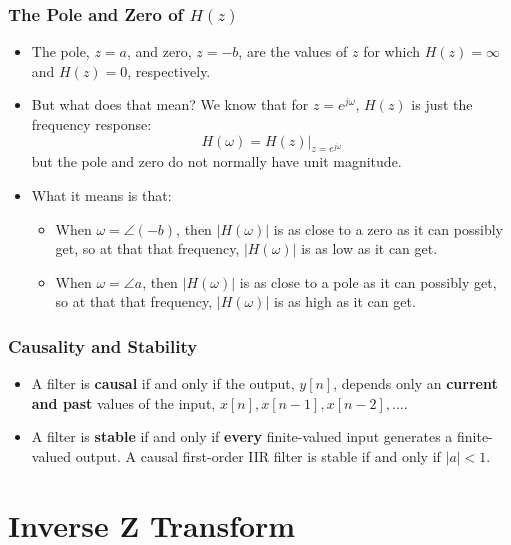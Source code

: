 \documentclass{beamer}
\begin{document}
\begin{frame}
  \frametitle{The Pole and Zero of $H(z)$}

  \begin{itemize}
  \item The pole, $z=a$, and zero, $z=-b$, are the values of $z$ for which
    $H(z)=\infty$  and $H(z)=0$, respectively.
  \item But what does that mean?  We know that for $z=e^{j\omega}$,
    $H(z)$ is just the frequency response:
    \[
    H(\omega) = H(z)\vert_{z=e^{j\omega}}
    \]
    but the pole and zero do not normally have unit magnitude.
  \item What it means is that:
    \begin{itemize}
      \item When $\omega=\angle (-b)$, then
        $|H(\omega)|$ is as close to a zero as it can possibly get, so at that 
        that frequency, $|H(\omega)|$ is as low as it can get.
      \item When $\omega=\angle a$, then
        $|H(\omega)|$ is as close to a pole as it can possibly get, so at that 
        that frequency, $|H(\omega)|$ is as high as it can get.
    \end{itemize}
  \end{itemize}
\end{frame}

\begin{frame}
  \frametitle{Causality and Stability}
  \begin{itemize}
  \item A filter is {\bf causal} if and only if the output, $y[n]$,
    depends only an {\bf current and past} values of the input, $x[n],
    x[n-1],x[n-2],\ldots$.
  \item A filter is {\bf stable} if and only if {\bf every}
    finite-valued input generates a finite-valued output.  A causal
    first-order IIR filter is stable if and only if $|a|<1$.
  \end{itemize}
\end{frame}

\section[Inverse]{Inverse Z Transform}
\setcounter{subsection}{1}
\end{document}
